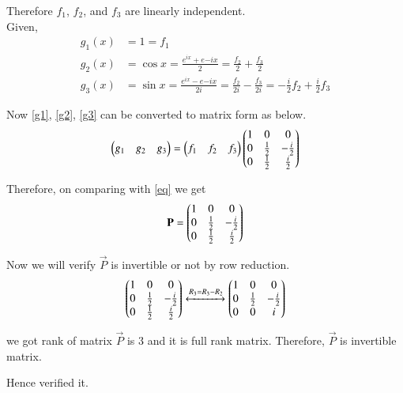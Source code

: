 \documentclass[journal,12pt,twocolumn]{IEEEtran}
\begin{document}
Therefore $f_1$, $f_2$, and $f_3$ are linearly independent.
\\
Given,
\begin{align}
    g_1(x)&=1=f_1\label{g1}\\
    g_2(x)&=\cos{x}=\frac{e^{ix}+e{-ix}}{2}=\frac{f_2}{2}+\frac{f_3}{2}\label{g2}\\
    g_3(x)&=\sin{x}=\frac{e^{ix}-e{-ix}}{2i}=\frac{f_2}{2i}-\frac{f_3}{2i}=-\frac{i}{2}f_2+\frac{i}{2}f_3\label{g3}
\end{align}

Now \eqref{g1}, \eqref{g2}, \eqref{g3} can be converted to matrix form as below.
\begin{align}
    \begin{pmatrix}g_1&g_2&g_3\end{pmatrix}=\begin{pmatrix}f_1&f_2&f_3\end{pmatrix}\begin{pmatrix}1&0&0\\0&\frac{1}{2}&-\frac{i}{2}\\0&\frac{1}{2}&\frac{i}{2}\end{pmatrix}
\end{align}

Therefore, on comparing with \eqref{eq} we get
\begin{align}
    \mathbf{P}=\begin{pmatrix}1&0&0\\0&\frac{1}{2}&-\frac{i}{2}\\0&\frac{1}{2}&\frac{i}{2}\end{pmatrix}
\end{align}

Now we will verify $\Vec{P}$ is invertible or not by row reduction.
\begin{align}
    \begin{pmatrix}1&0&0\\0&\frac{1}{2}&-\frac{i}{2}\\0&\frac{1}{2}&\frac{i}{2}\end{pmatrix}\xleftrightarrow{R_3=R_3-R_2}\begin{pmatrix}1&0&0\\0&\frac{1}{2}&-\frac{i}{2}\\0&0&i\end{pmatrix}
\end{align}

we got rank of matrix $\vec{P}$ is 3 and it is full rank matrix. Therefore, $\vec{P}$ is invertible matrix.

Hence verified it.
\end{document}
